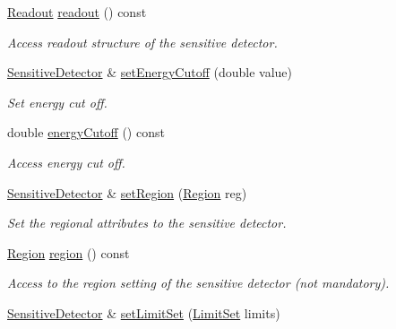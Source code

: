 \begin{DoxyCompactItemize}
\hyperlink{class_d_d4hep_1_1_geometry_1_1_readout}{Readout} \hyperlink{class_d_d4hep_1_1_geometry_1_1_sensitive_detector_ab805f5078384b7d8be6f58e109eefccd}{readout} () const 
\begin{DoxyCompactList}\small\item\em Access readout structure of the sensitive detector. \item\end{DoxyCompactList}\item 
\hyperlink{class_d_d4hep_1_1_geometry_1_1_sensitive_detector}{SensitiveDetector} \& \hyperlink{class_d_d4hep_1_1_geometry_1_1_sensitive_detector_a43bc3d1e14b74fbaa85043dedb940a39}{setEnergyCutoff} (double value)
\begin{DoxyCompactList}\small\item\em Set energy cut off. \item\end{DoxyCompactList}\item 
double \hyperlink{class_d_d4hep_1_1_geometry_1_1_sensitive_detector_a07ed75fb993527ca9b2bc23e720c4098}{energyCutoff} () const 
\begin{DoxyCompactList}\small\item\em Access energy cut off. \item\end{DoxyCompactList}\item 
\hyperlink{class_d_d4hep_1_1_geometry_1_1_sensitive_detector}{SensitiveDetector} \& \hyperlink{class_d_d4hep_1_1_geometry_1_1_sensitive_detector_a3fafb658e1cc5dbe7a1683e5420cce46}{setRegion} (\hyperlink{class_d_d4hep_1_1_geometry_1_1_region}{Region} reg)
\begin{DoxyCompactList}\small\item\em Set the regional attributes to the sensitive detector. \item\end{DoxyCompactList}\item 
\hyperlink{class_d_d4hep_1_1_geometry_1_1_region}{Region} \hyperlink{class_d_d4hep_1_1_geometry_1_1_sensitive_detector_af7fd7953dddb6fce1f6dea711adbba46}{region} () const 
\begin{DoxyCompactList}\small\item\em Access to the region setting of the sensitive detector (not mandatory). \item\end{DoxyCompactList}\item 
\hyperlink{class_d_d4hep_1_1_geometry_1_1_sensitive_detector}{SensitiveDetector} \& \hyperlink{class_d_d4hep_1_1_geometry_1_1_sensitive_detector_a24994b8d62969f2d16e1cdf543a8e9bc}{setLimitSet} (\hyperlink{class_d_d4hep_1_1_geometry_1_1_limit_set}{LimitSet} limits)

\end{DoxyCompactItemize}
